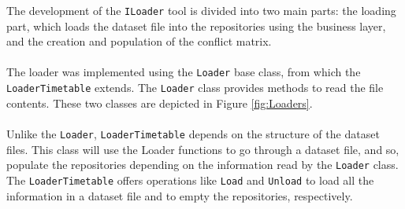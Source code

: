 The development of the \verb+ILoader+ tool is divided into two main parts: the loading part, which loads the dataset file into the repositories using the business layer, and the creation and population of the conflict matrix.\\
\\
The loader was implemented using the \verb+Loader+ base class, from which the \verb+LoaderTimetable+ extends. The \verb+Loader+ class provides methods to read the file contents. These two classes are depicted in Figure \ref{fig:Loaders}.\\
\\
Unlike the \verb+Loader+, \verb+LoaderTimetable+ depends on the structure of the dataset files. This class will use the Loader functions to go through a dataset file, and so, populate the repositories depending on the information read by the \verb+Loader+ class. The \verb+LoaderTimetable+ offers operations like \verb+Load+ and \verb+Unload+ to load all the information in a dataset file and to empty the repositories, respectively.\\
\\
